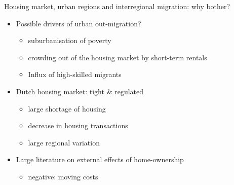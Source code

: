 \documentclass{beamer}
\begin{document}
\begin{frame}{Housing market, urban regions and interregional migration: why bother?}
  \begin{itemize}
	\item Possible drivers of urban out-migration?
	  \begin{itemize}
		\item \alert{suburbanisation} of poverty \footnotesize{\citep{hochstenbach2018gentrification}}
		\item \alert{crowding} out of the housing market by short-term rentals
		  \footnotesize{\citep{koster2018short}}
		\item \alert{Influx} of high-skilled migrants
		  \footnotesize{\citep{beckers2019residential}}\newline \pause
\end{itemize}
\item Dutch housing market: \alert{tight} \& regulated
	  \begin{itemize}
   			\item large \alert{shortage} of housing
   			\item decrease in housing \alert{transactions}
   			\item large \alert{regional} variation\newline \pause
   		\end{itemize}
   		\item Large literature on \alert{external} effects of home-ownership \footnotesize{\citep{dietz2003social}}
   		\begin{itemize}
   			\item \alert{negative}: moving costs \footnotesize{\citep{oswald1996conjecture,oswald1999housing}}
   		\end{itemize}
  \end{itemize}
\end{frame}
\end{document}
